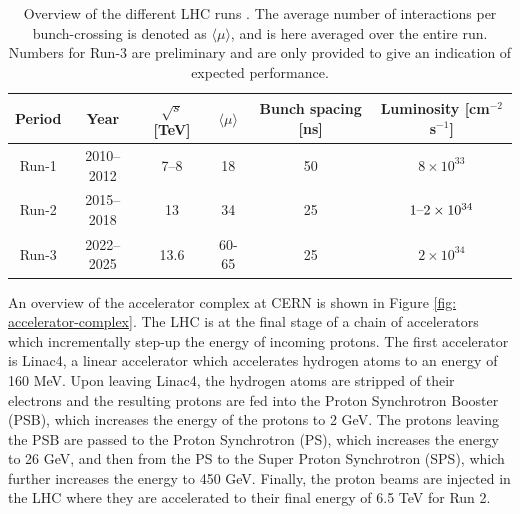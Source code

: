 \begin{table}[!htbp]
  \footnotesize\centering
  \setlength{\tabcolsep}{0.5em} %
  \begin{tabular}{cc|cccc}
      \toprule
      \textbf{Period} & \textbf{Year} & $\sqrt{s}$ [TeV] 
      & $\langle \mu \rangle$ & \textbf{Bunch spacing} [ns] & \textbf{Luminosity} [cm$^{−2}$s$^{−1}$] \\
      \hline
      Run-1 & 2010--2012 & \SIrange[range-phrase=--,range-units=single,range-exponents=combine]{7}{8}{} & 18 & 50 & $8 \times 10^{33}$ \\
      Run-2 & 2015--2018 & \SI{13  }{} & 34 & 25 & $1\textnormal{--}2 \times 10^{34}$ \\
      Run-3 & 2022--2025 & \SI{13.6}{} & 60-65 & 25 & $2 \times 10^{34}$ \\
      \bottomrule
  \end{tabular}
  \caption{
    Overview of the different \ac{LHC} runs \cite{atlas-lumi-run1,atlas-lumi-run2}.
    The average number of interactions per bunch-crossing is denoted as $\langle \mu \rangle$, and is here averaged over the entire run. Numbers for Run-3 are preliminary and are only provided to give an indication of expected performance.
  }
  \label{tab:lhc-runs}
\end{table}

An overview of the accelerator complex at CERN is shown in Figure \ref{fig: accelerator-complex}. The \ac{LHC} is at the final stage of a chain of accelerators which incrementally step-up the energy of incoming protons. The first accelerator is Linac4, a linear accelerator which accelerates hydrogen atoms to an energy of 160 MeV. Upon leaving Linac4, the hydrogen atoms are stripped of their electrons and the resulting protons are fed into the Proton Synchrotron Booster (PSB), which increases the energy of the protons to 2 GeV. The protons leaving the PSB are passed to the Proton Synchrotron (PS), which increases the energy to 26 GeV, and then from the PS to the Super Proton Synchrotron (SPS), which further increases the energy to 450 GeV. Finally, the proton beams are injected in the \ac{LHC} where they are accelerated to their final energy of 6.5 TeV for Run 2.

